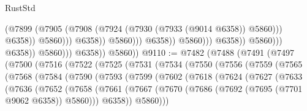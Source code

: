 \begin{lexlean}{RustStd}
\begin{coremodule}
                                                          (@7899
                                                            (@7905
                                                              (@7908
                                                                (@7924
                                                                  (@7930
                                                                    (@7933 (@9014 @6358))
                                                                    @5860)))
                                                              @6358))
                                                          @5860)))
                                                    @6358))
                                                @5860)))
                                          @6358))
                                      @5860)))
                                @6358))
                            @5860)))
                      @6358))
                  @5860)))
            @6358))
        @5860))
@9110 := @7482
    (@7488
      (@7491
        (@7497
          (@7500
            (@7516
              (@7522
                (@7525
                  (@7531
                    (@7534
                      (@7550
                        (@7556
                          (@7559
                            (@7565
                              (@7568
                                (@7584
                                  (@7590
                                    (@7593
                                      (@7599
                                        (@7602
                                          (@7618
                                            (@7624
                                              (@7627
                                                (@7633
                                                  (@7636
                                                    (@7652
                                                      (@7658
                                                        (@7661
                                                          (@7667
                                                            (@7670
                                                              (@7686
                                                                (@7692
                                                                  (@7695 (@7701 @9062 @6358))
                                                                  @5860)))
                                                            @6358))
                                                        @5860)))

\end{coremodule}
\end{lexlean}
